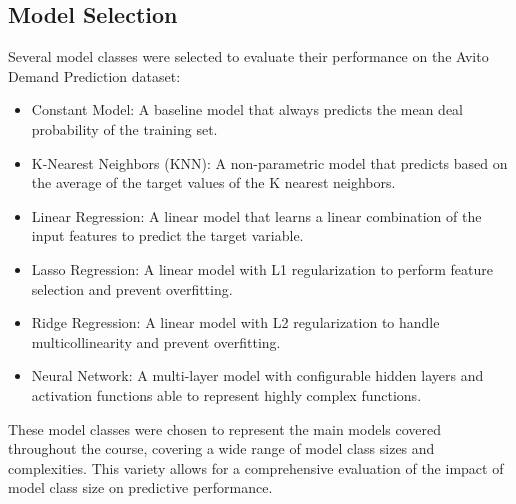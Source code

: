 \documentclass{article}
\begin{document}
\subsection{Model Selection}
Several model classes were selected to evaluate their performance on the Avito Demand Prediction dataset:
\begin{itemize}
\item Constant Model: A baseline model that always predicts the mean deal probability of the training set.
\item K-Nearest Neighbors (KNN): A non-parametric model that predicts based on the average of the target values of the K nearest neighbors.
\item Linear Regression: A linear model that learns a linear combination of the input features to predict the target variable.
\item Lasso Regression: A linear model with L1 regularization to perform feature selection and prevent overfitting.
\item Ridge Regression: A linear model with L2 regularization to handle multicollinearity and prevent overfitting.
\item Neural Network: A multi-layer model with configurable hidden layers and activation functions able to represent highly complex functions.
\end{itemize}
These model classes were chosen to represent the main models covered throughout the course, covering a wide range of model class sizes and complexities. This variety allows for a comprehensive evaluation of the impact of model class size on predictive performance.
\end{document}

